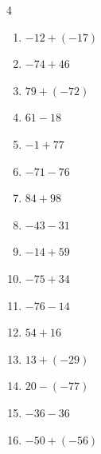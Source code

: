 \begin{multicols}{4}
\begin{enumerate}
  \item $-12+(-17)$

        \phantom{$=-29$}

  \item $-74+46$

        \phantom{$=-28$}

  \item $79+(-72)$

        \phantom{$=7$}

\columnbreak %

  \item $61-18$

        \phantom{$=43$}

  \item $-1+77$

        \phantom{$=76$}

  \item $-71-76$

        \phantom{$=-147$}

  \item $84+98$

        \phantom{$=182$}

  \item $-43-31$

        \phantom{$=-74$}

  \item $-14+59$

        \phantom{$=45$}

  \item $-75+34$

        \phantom{$=-41$}

  \item $-76-14$

        \phantom{$=-90$}

  \item $54+16$

        \phantom{$=70$}

  \item $13+(-29)$

        \phantom{$=-16$}

  \item $20-(-77)$

        \phantom{$=97$}

  \item $-36-36$

        \phantom{$=-72$}

  \item $-50+(-56)$


\end{enumerate}
\end{multicols}
